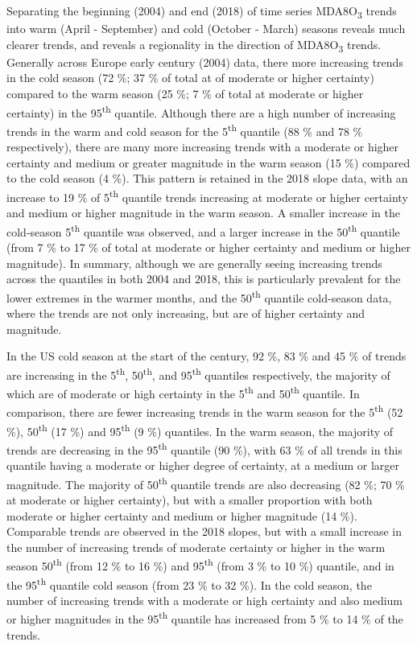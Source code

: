 \documentclass[journal abbreviation, manuscript]{copernicus}
\begin{document}
Separating the beginning (2004) and end (2018) of time series MDA8O\textsubscript{3} trends into warm (April - September) and cold (October - March) seasons reveals much clearer trends, and reveals a regionality in the direction of MDA8O\textsubscript{3} trends. Generally across Europe early century (2004) data, there more increasing trends in the cold season (72 \%; 37 \% of total at of moderate or higher certainty) compared to the warm season (25 \%; 7 \% of total at moderate or higher certainty) in the 95\textsuperscript{th} quantile. Although there are a high number of increasing trends in the warm and cold season for the 5\textsuperscript{th} quantile (88 \% and 78 \% respectively), there are many more increasing trends with a moderate or higher certainty and medium or greater magnitude in the warm season (15 \%) compared to the cold season (4 \%). This pattern is retained in the 2018 slope data, with an increase to 19 \% of 5\textsuperscript{th} quantile trends increasing at moderate or higher certainty and medium or higher magnitude in the warm season. A smaller increase in the cold-season 5\textsuperscript{th} quantile was observed, and a larger increase in the 50\textsuperscript{th} quantile (from 7 \% to 17 \% of total at moderate or higher certainty and medium or higher magnitude). In summary, although we are generally seeing increasing trends across the quantiles in both 2004 and 2018, this is particularly prevalent for the lower extremes in the warmer months, and the 50\textsuperscript{th} quantile cold-season data, where the trends are not only increasing, but are of higher certainty and magnitude.

In the US cold season at the start of the century, 92 \%, 83 \% and 45 \% of trends are increasing in the 5\textsuperscript{th}, 50\textsuperscript{th}, and 95\textsuperscript{th} quantiles respectively, the majority of which are of moderate or high certainty in the 5\textsuperscript{th} and 50\textsuperscript{th} quantile. In comparison, there are fewer increasing trends in the warm season for the 5\textsuperscript{th} (52 \%), 50\textsuperscript{th} (17 \%) and 95\textsuperscript{th} (9 \%) quantiles. In the warm season, the majority of trends are decreasing in the 95\textsuperscript{th} quantile (90 \%), with 63 \% of all trends in this quantile having a moderate or higher degree of certainty, at a medium or larger magnitude. The majority of 50\textsuperscript{th} quantile trends are also decreasing (82 \%; 70 \% at moderate or higher certainty), but with a smaller proportion with both moderate or higher certainty and medium or higher magnitude (14 \%). Comparable trends are observed in the 2018 slopes, but with a small increase in the number of increasing trends of moderate certainty or higher in the warm season 50\textsuperscript{th} (from 12 \% to 16 \%) and 95\textsuperscript{th} (from 3 \% to 10 \%) quantile, and in the 95\textsuperscript{th} quantile cold season (from 23 \% to 32 \%). In the cold season, the number of increasing trends with a moderate or high certainty and also medium or higher magnitudes in the 95\textsuperscript{th} quantile has increased from 5 \% to 14 \% of the trends.
\end{document}
